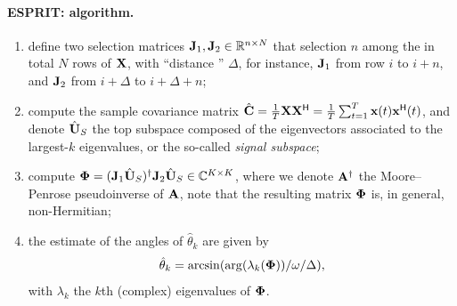 \documentclass[11pt,a4paper]{article}
\begin{document}
\paragraph{ESPRIT: algorithm.}
\begin{enumerate}
  \item define two selection matrices ${\mathbf{J}}_1, {\mathbf{J}}_2 \in {\mathbb{R}}^{n \times N}$ that selection $n$ among the in total $N$ rows of ${\mathbf{X}}$, with ``distance '' $\Delta$, for instance, ${\mathbf{J}}_1$ from row $i$ to $i+n$, and ${\mathbf{J}}_2$ from $i+\Delta$ to $i+\Delta+n$;
  \item compute the sample covariance matrix $\hat {{\mathbf{C}}} = \frac1T {\mathbf{X}} {\mathbf{X}}^{\sf H} = \frac1T \sum_{t=1}^T \mathbf{x}(t) \mathbf{x}^{\sf H}(t)$, and denote $\hat {{\mathbf{U}}}_S$ the top subspace composed of the eigenvectors associated to the largest-$k$ eigenvalues, or the so-called \emph{signal subspace};
  \item compute ${\boldsymbol{\Phi}} = ({\mathbf{J}}_1 \hat {{\mathbf{U}}}_S)^\dagger {\mathbf{J}}_2 \hat {{\mathbf{U}}}_S \in {\mathbb{C}}^{K \times K}$, where we denote ${\mathbf{A}}^\dagger$ the Moore–Penrose pseudoinverse of ${\mathbf{A}}$, note that the resulting matrix ${\boldsymbol{\Phi}}$ is, in general, non-Hermitian;
  \item the estimate of the angles of $\hat \theta_k$ are given by
  \begin{equation}
  	\hat \theta_k = \arcsin(\arg(\lambda_k({\boldsymbol{\Phi}}))/\omega/\Delta),
  \end{equation}
  with $\lambda_k$ the $k$th (complex) eigenvalues of ${\boldsymbol{\Phi}}$.
 \end{enumerate}


\end{document}
